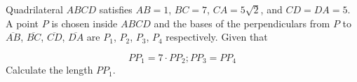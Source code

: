 Quadrilateral $ABCD$ satisfies $AB = 1$, $BC = 7$, $CA = 5\sqrt{2}$, and $CD = DA = 5$. A point $P$ is chosen inside $ABCD$ and the bases of the perpendiculars from $P$ to $\overline{AB}$, $\overline{BC}$, $\overline{CD}$, $\overline{DA}$ are $P_1$, $P_2$, $P_3$, $P_4$ respectively. Given that

\[
PP_1 = 7 \cdot PP_2; PP_3 = PP_4
\]Calculate the length $PP_1$.
